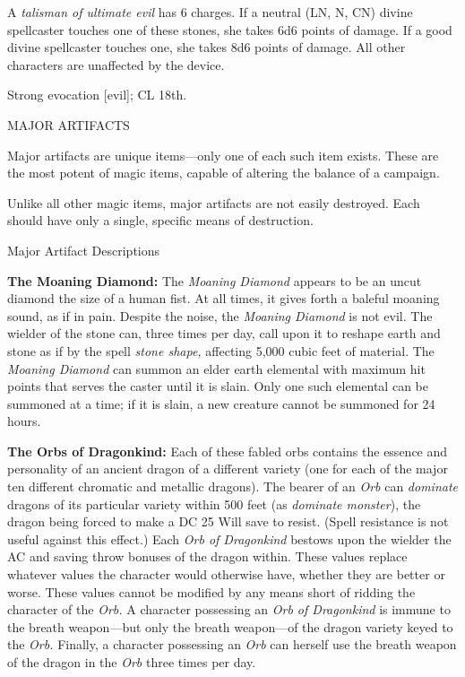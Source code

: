 \documentclass{article}
\begin{document}
A \textit{talisman of ultimate evil }has 6 charges. If a neutral (LN, N, CN) divine 
spellcaster touches one of these stones, she takes 6d6 points of damage. If a good 
divine spellcaster touches one, she takes 8d6 points of damage. All other characters 
are unaffected by the device. 

Strong evocation [evil]; CL 18th.

\vspace{12pt}
MAJOR ARTIFACTS

Major artifacts are unique items---only one of each such item exists. These are 
the most potent of magic items, capable of altering the balance of a campaign.

Unlike all other magic items, major artifacts are not easily destroyed. Each should 
have only a single, specific means of destruction.

\vspace{12pt}
Major Artifact Descriptions

\vspace{12pt}
\textbf{The Moaning Diamond:} The \textit{Moaning Diamond }appears to be an uncut 
diamond the size of a human fist. At all times, it gives forth a baleful moaning 
sound, as if in pain. Despite the noise, the \textit{Moaning Diamond }is not evil. 
The wielder of the stone can, three times per day, call upon it to reshape earth 
and stone as if by the spell \textit{stone shape, }affecting 5,000 cubic feet of 
material. The \textit{Moaning Diamond }can summon an elder earth elemental with 
maximum hit points that serves the caster until it is slain. Only one such elemental 
can be summoned at a time; if it is slain, a new creature cannot be summoned for 
24 hours. 

\vspace{12pt}
\textbf{The Orbs of Dragonkind:} Each of these fabled orbs contains the essence 
and personality of an ancient dragon of a different variety (one for each of the 
major ten different chromatic and metallic dragons). The bearer of an \textit{Orb 
}can \textit{dominate }dragons of its particular variety within 500 feet (as \textit{dominate 
monster}), the dragon being forced to make a DC 25 Will save to resist. (Spell 
resistance is not useful against this effect.) Each \textit{Orb of Dragonkind }bestows 
upon the wielder the AC and saving throw bonuses of the dragon within. These values 
replace whatever values the character would otherwise have, whether they are better 
or worse. These values cannot be modified by any means short of ridding the character 
of the \textit{Orb. }A character possessing an \textit{Orb of Dragonkind }is immune 
to the breath weapon---but only the breath weapon---of the dragon variety keyed 
to the \textit{Orb. }Finally, a character possessing an \textit{Orb }can herself 
use the breath weapon of the dragon in the \textit{Orb }three times per day.
\end{document}
